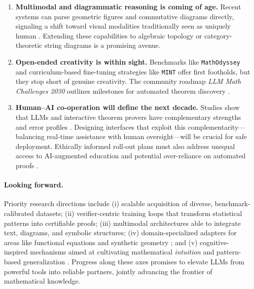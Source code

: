 \documentclass[acmsmall,anonymous]{acmart}
\begin{document}
\begin{enumerate}
    \item \textbf{Multimodal and diagrammatic reasoning is coming of age.}  Recent systems can parse geometric figures and commutative diagrams directly, signaling a shift toward visual modalities traditionally seen as uniquely human \cite{zhang2024diagramformalization}.  Extending these capabilities to algebraic topology or category-theoretic string diagrams is a promising avenue.

    \item \textbf{Open-ended creativity is within sight.}  Benchmarks like \texttt{MathOdyssey} \cite{zhang2024mathodyssey} and curriculum-based fine-tuning strategies like \texttt{MINT} \cite{li2024mint} offer first footholds, but they stop short of genuine creativity.  The community roadmap \emph{LLM Math Challenges 2030} outlines milestones for automated theorem discovery \cite{llm-math-challenges2024}.

    \item \textbf{Human–AI co-operation will define the next decade.}  Studies show that LLMs and interactive theorem provers have complementary strengths and error profiles \cite{johnson2024llmvsitp,yang-2023-leandojo}.  Designing interfaces that exploit this complementarity—balancing real-time assistance with human oversight—will be crucial for safe deployment.  Ethically informed roll-out plans must also address unequal access to AI-augmented education and potential over-reliance on automated proofs \cite{buzzard2019future,ahn2024largelanguagemodels}.
\end{enumerate}

\paragraph{Looking forward.}
Priority research directions include (i) scalable acquisition of diverse, benchmark-calibrated datasets; (ii) verifier-centric training loops that transform statistical patterns into certifiable proofs; (iii) multimodal architectures able to integrate text, diagrams, and symbolic structures; (iv) domain-specialized adapters for areas like functional equations \cite{buali2024towards} and synthetic geometry \cite{sinha2024wusmethod}; and (v) cognitive-inspired mechanisms aimed at cultivating mathematical \emph{intuition} and pattern-based generalization \cite{li2024mindstar}.  Progress along these axes promises to elevate LLMs from powerful tools into reliable partners, jointly advancing the frontier of mathematical knowledge.
\end{document}
